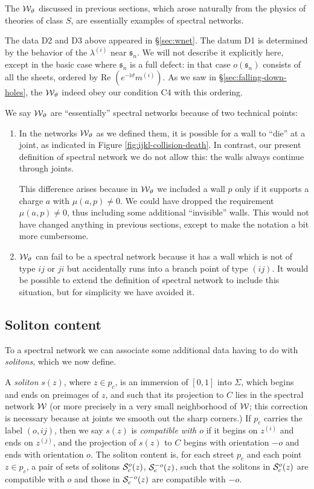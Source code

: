 \documentclass[11pt,a4paper]{article}
\def\re{\mbox{Re }}
\def\wnet {{\cal W}}
\def\CS {{\cal S}}
\def\cS {{\cal S}}
\newcommand{\ti}[1]{\textit{#1}}
\def\fs{\mathfrak{s}}
\def\re{\mbox{Re }}
\def\wnet {{\cal W}}
\def\CS {{\cal S}}
\newcommand\I{{\mathrm i}}
\begin{document}
The $\wnet_{\vartheta}$ discussed in previous sections, which arose naturally from the
physics of theories of class $S$, are essentially examples of spectral networks.

The data D2 and D3 above appeared in \S\ref{sec:wnet}.
The datum D1 is determined by the behavior of the $\lambda^{(i)}$ near $\fs_n$.  We will not describe it
explicitly here, except in the basic case where $\fs_n$ is a full defect:  in that
case $o(\fs_n)$ consists of all the sheets,
ordered by $\re(e^{-\I \vartheta} m^{(i)})$.  As we saw in \S\ref{sec:falling-down-holes},
the $\wnet_\vartheta$ indeed obey our condition C4 with this
ordering.

We say $\wnet_\vartheta$ are ``essentially'' spectral networks
because of two technical points:

\begin{enumerate}
 \item In the networks
$\wnet_\vartheta$ as we defined them, it is possible for a wall to ``die''
at a joint, as indicated in Figure \ref{fig:ijkl-collision-death}.
In contrast, our present definition of spectral network
we do not allow this:  the walls always continue through joints.

This difference arises because in $\wnet_\vartheta$
we included a wall $p$ only if it supports a charge $a$ with $\mu(a,p) \neq 0$.
We could have dropped the requirement $\mu(a,p) \neq 0$, thus including some additional
``invisible'' walls.  This would not have changed anything in previous
sections, except to make the notation a bit more cumbersome.

\item $\wnet_\vartheta$ can fail to be a spectral network because it has a wall which
is not of type $ij$ or $ji$ but accidentally runs into a branch point of type $(ij)$.  It would be
possible to extend the definition of spectral network to include this situation, but for simplicity
we have avoided it.
\end{enumerate}


\subsection{Soliton content}\label{subsec:Soliton-content}

To a spectral network we can associate some additional data
having to do with \ti{solitons}, which we now define.

A \emph{soliton} $s(z)$, where $z\in p_c$, is an immersion of $[0,1]$ into $\Sigma$,
which begins and ends on preimages of $z$, and such that its projection to $C$ lies
in the spectral network $\wnet$ (or more precisely in a very small neighborhood of $\wnet$;
this correction is necessary because at joints we smooth out
the sharp corners.)  If $p_c$ carries the label $(o, ij)$,
then we say $s(z)$ is \emph{compatible with $o$}
if it begins on $z^{(i)}$ and ends on $z^{(j)}$, and the projection of
$s(z)$ to $C$ begins with orientation $-o$ and ends with orientation $o$.
The soliton content is, for each street $p_c$ and each point $z \in p_c$, a pair of sets of
solitons $\CS^o_c(z)$, $\CS^{-o}_c(z)$, such that
the solitons in $\CS^{o}_c(z)$ are compatible with $o$ and
those in $\cS^{-o}_c(z)$ are compatible with $-o$.
\end{document}
